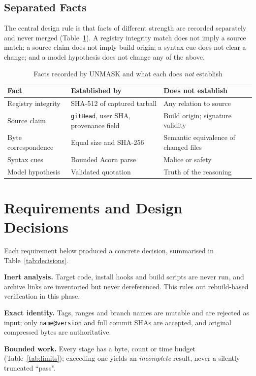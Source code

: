 \documentclass[conference]{IEEEtran}
\newcommand{\code}[1]{\texttt{#1}}
\begin{document}
\subsection{Separated Facts}
The central design rule is that facts of different strength are recorded
separately and never merged (Table~\ref{tab:facts}). A registry integrity match
does not imply a source match; a source claim does not imply build origin; a
syntax cue does not clear a change; and a model hypothesis does not change any
of the above.

\begin{table}[t]
\caption{Facts recorded by UNMASK and what each does \emph{not} establish}
\label{tab:facts}
\centering
\footnotesize
\begin{tabular}{@{}p{2.1cm}p{2.6cm}p{2.7cm}@{}}
\toprule
\textbf{Fact} & \textbf{Established by} & \textbf{Does not establish}\\
\midrule
Registry integrity & SHA-512 of captured tarball & Any relation to source\\
Source claim & \code{gitHead}, user SHA, provenance field & Build origin; signature validity\\
Byte correspondence & Equal size and SHA-256 & Semantic equivalence of changed files\\
Syntax cues & Bounded Acorn parse & Malice or safety\\
Model hypothesis & Validated quotation & Truth of the reasoning\\
\bottomrule
\end{tabular}
\end{table}

\section{Requirements and Design Decisions}\label{sec:design}

Each requirement below produced a concrete decision, summarised in
Table~\ref{tab:decisions}.

\textbf{Inert analysis.} Target code, install hooks and build scripts are never
run, and archive links are inventoried but never dereferenced. This rules out
rebuild-based verification in this phase.

\textbf{Exact identity.} Tags, ranges and branch names are mutable and are
rejected as input; only \code{name@version} and full commit SHAs are accepted,
and original compressed bytes are authoritative.

\textbf{Bounded work.} Every stage has a byte, count or time budget
(Table~\ref{tab:limits}); exceeding one yields an \emph{incomplete} result, never
a silently truncated ``pass''.
\end{document}
